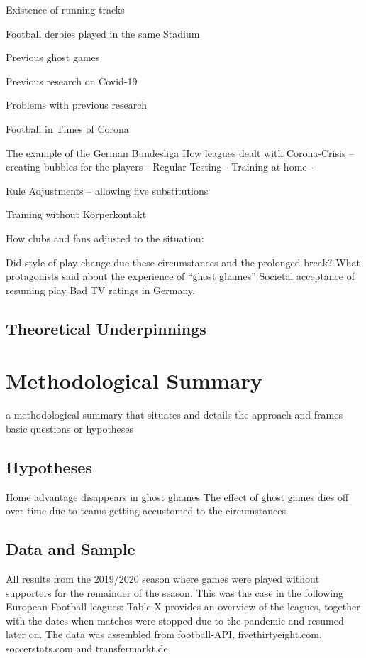 \documentclass[Afour,sageh,times]{sagej}
\begin{document}
Existence of running tracks

Football derbies played in the same Stadium

Previous ghost games

Previous research on Covid-19

Problems with previous research

Football in Times of Corona

The example of the German Bundesliga
How leagues dealt with Corona-Crisis – creating bubbles for the players
-	Regular Testing
-	Training at home
-	

Rule Adjustments – allowing five substitutions

Training without Körperkontakt

How clubs and fans adjusted to the situation: 

Did style of play change due these circumstances and the prolonged break?
What protagonists said about the experience of “ghost ghames”
Societal acceptance of resuming play
Bad TV ratings in Germany.

\subsection{Theoretical Underpinnings}

\section{Methodological Summary} 
a methodological summary that situates and details the approach and frames basic questions or hypotheses

\subsection{Hypotheses}
Home advantage disappears in ghost ghames
The effect of ghost games dies off over time due to teams getting accustomed to the circumstances.


\subsection{Data and Sample}
All results from the 2019/2020 season where games were played without supporters for the remainder of the season.
This was the case in the following European Football leagues: Table X provides an overview of the leagues, together with the dates when matches were stopped due to the pandemic and resumed later on.
The data was assembled from football-API, fivethirtyeight.com, soccerstats.com and transfermarkt.de
\end{document}
